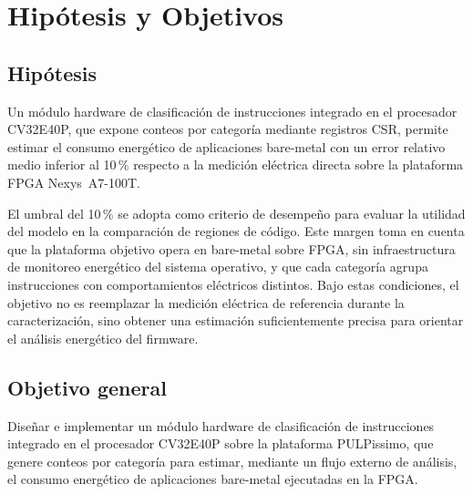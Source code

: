 \chapter{Hipótesis y Objetivos}
\label{ch:obj}


\section{Hipótesis}
\label{sec:hipotesis}

Un módulo hardware de clasificación de instrucciones integrado en el procesador
CV32E40P, que expone conteos por categoría mediante registros CSR, permite
estimar el consumo energético de aplicaciones bare-metal con un error relativo
medio inferior al 10\,\% respecto a la medición eléctrica directa sobre la
plataforma FPGA Nexys~A7-100T.

El umbral del 10\,\% se adopta como criterio de desempeño para evaluar la
utilidad del modelo en la comparación de regiones de código. Este margen toma
en cuenta que la plataforma objetivo opera en bare-metal sobre FPGA, sin
infraestructura de monitoreo energético del sistema operativo, y que cada
categoría agrupa instrucciones con comportamientos eléctricos distintos. Bajo
estas condiciones, el objetivo no es reemplazar la medición eléctrica de
referencia durante la caracterización, sino obtener una estimación suficientemente
precisa para orientar el análisis energético del firmware.

\section{Objetivo general}
\label{sec:obj_general}

Diseñar e implementar un módulo hardware de clasificación de instrucciones
integrado en el procesador CV32E40P sobre la plataforma PULPissimo, que genere
conteos por categoría para estimar, mediante un flujo externo de análisis, el
consumo energético de aplicaciones bare-metal ejecutadas en la FPGA.

